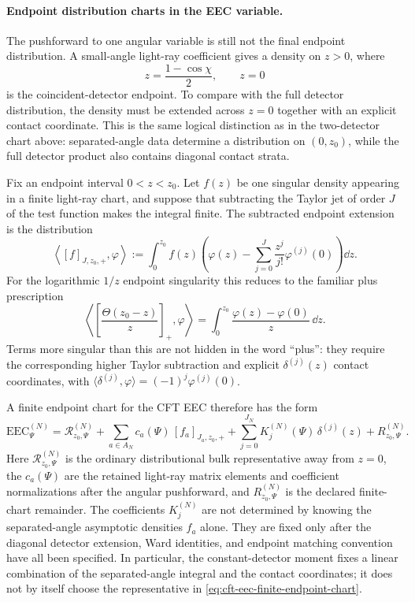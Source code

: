\paragraph{Endpoint distribution charts in the EEC variable.}
The pushforward to one angular variable is still not the final endpoint
distribution.  A small-angle light-ray coefficient gives a density on
\(z>0\), where
\[
  z=\frac{1-\cos\chi}{2},
  \qquad z=0
\]
is the coincident-detector endpoint.  To compare with the full detector
distribution, the density must be extended across \(z=0\) together with an
explicit contact coordinate.  This is the same logical distinction as in the
two-detector chart above: separated-angle data determine a distribution on
\((0,z_0)\), while the full detector product also contains diagonal contact
strata.

Fix an endpoint interval \(0<z<z_0\).  Let \(f(z)\) be one singular density
appearing in a finite light-ray chart, and suppose that subtracting the Taylor
jet of order \(J\) of the test function makes the integral finite.  The
subtracted endpoint extension is the distribution
\begin{equation}
  \left\langle [f]_{J,z_0,+},\varphi\right\rangle
  :=
  \int_0^{z_0} f(z)
  \left(
    \varphi(z)
    -
    \sum_{j=0}^J
      \frac{z^j}{j!}\varphi^{(j)}(0)
  \right)\dd z .
  \label{eq:cft-eec-subtracted-endpoint-extension}
\end{equation}
For the logarithmic \(1/z\) endpoint singularity this reduces to the familiar
plus prescription
\[
  \left\langle
    \left[\frac{\Theta(z_0-z)}{z}\right]_{+},
    \varphi
  \right\rangle
  =
  \int_0^{z_0}
    \frac{\varphi(z)-\varphi(0)}{z}\,\dd z .
\]
Terms more singular than this are not hidden in the word ``plus'': they
require the corresponding higher Taylor subtraction and explicit
\(\delta^{(j)}(z)\) contact coordinates, with
\(\langle\delta^{(j)},\varphi\rangle=(-1)^j\varphi^{(j)}(0)\).

A finite endpoint chart for the CFT EEC therefore has the form
\begin{equation}
  \mathrm{EEC}^{(N)}_\Psi
  =
  \mathcal R^{(N)}_{z_0,\Psi}
  +
  \sum_{a\in A_N}
    c_a(\Psi)\,[f_a]_{J_a,z_0,+}
  +
  \sum_{j=0}^{J_N}
    K_j^{(N)}(\Psi)\,\delta^{(j)}(z)
  +
  R^{(N)}_{z_0,\Psi}.
  \label{eq:cft-eec-finite-endpoint-chart}
\end{equation}
Here \(\mathcal R^{(N)}_{z_0,\Psi}\) is the ordinary distributional bulk
representative away from \(z=0\), the \(c_a(\Psi)\) are the retained
light-ray matrix elements and coefficient normalizations after the angular
pushforward, and \(R^{(N)}_{z_0,\Psi}\) is the declared finite-chart
remainder.  The coefficients \(K_j^{(N)}\) are not determined by knowing the
separated-angle asymptotic densities \(f_a\) alone.  They are fixed only after
the diagonal detector extension, Ward identities, and endpoint matching
convention have all been specified.  In particular, the constant-detector
moment fixes a linear combination of the separated-angle integral and the
contact coordinates; it does not by itself choose the representative in
\eqref{eq:cft-eec-finite-endpoint-chart}.

